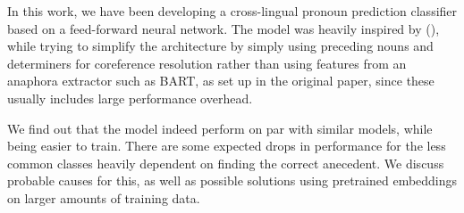 \documentclass[11pt]{article}
\begin{document}
In this work, we have been developing a cross-lingual pronoun prediction classifier based on a feed-forward neural network.
The model was heavily inspired by (\cite{Hardmeier2013Latent}), while trying to simplify the architecture by simply using preceding nouns and determiners for coreference resolution rather than using features from an anaphora extractor such as BART, as set up in the original paper, since these usually includes large performance overhead.

We find out that the model indeed perform on par with similar models, while being easier to train.
There are some expected drops in performance for the less common classes heavily dependent on finding the correct anecedent.
We discuss probable causes for this, as well as possible solutions using pretrained embeddings on larger amounts of training data.

\printbibliography
\end{document}
